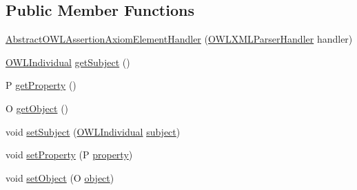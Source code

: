 \subsection*{Public Member Functions}
\begin{DoxyCompactItemize}
\item 
\hyperlink{classorg_1_1coode_1_1owlapi_1_1owlxmlparser_1_1_abstract_o_w_l_assertion_axiom_element_handler_3400ddbb774fad720b1e593f64f8eec5c_a1da5eaf534d45363fe870e9d575d419d}{Abstract\-O\-W\-L\-Assertion\-Axiom\-Element\-Handler} (\hyperlink{classorg_1_1coode_1_1owlapi_1_1owlxmlparser_1_1_o_w_l_x_m_l_parser_handler}{O\-W\-L\-X\-M\-L\-Parser\-Handler} handler)
\item 
\hyperlink{interfaceorg_1_1semanticweb_1_1owlapi_1_1model_1_1_o_w_l_individual}{O\-W\-L\-Individual} \hyperlink{classorg_1_1coode_1_1owlapi_1_1owlxmlparser_1_1_abstract_o_w_l_assertion_axiom_element_handler_3400ddbb774fad720b1e593f64f8eec5c_a8fbeb072a0ed7fd3f73ecd8eb6bcfdf8}{get\-Subject} ()
\item 
P \hyperlink{classorg_1_1coode_1_1owlapi_1_1owlxmlparser_1_1_abstract_o_w_l_assertion_axiom_element_handler_3400ddbb774fad720b1e593f64f8eec5c_a1a99e4db426c1bffc99bcf87b22bcdf6}{get\-Property} ()
\item 
O \hyperlink{classorg_1_1coode_1_1owlapi_1_1owlxmlparser_1_1_abstract_o_w_l_assertion_axiom_element_handler_3400ddbb774fad720b1e593f64f8eec5c_a63b877d7308fadd891f978d8bc8245c7}{get\-Object} ()
\item 
void \hyperlink{classorg_1_1coode_1_1owlapi_1_1owlxmlparser_1_1_abstract_o_w_l_assertion_axiom_element_handler_3400ddbb774fad720b1e593f64f8eec5c_ad111b4853de03d8f7f41da1873ef3d72}{set\-Subject} (\hyperlink{interfaceorg_1_1semanticweb_1_1owlapi_1_1model_1_1_o_w_l_individual}{O\-W\-L\-Individual} \hyperlink{classorg_1_1coode_1_1owlapi_1_1owlxmlparser_1_1_abstract_o_w_l_assertion_axiom_element_handler_3400ddbb774fad720b1e593f64f8eec5c_ae4e2e75193f17306c6ab9e01d654bac4}{subject})
\item 
void \hyperlink{classorg_1_1coode_1_1owlapi_1_1owlxmlparser_1_1_abstract_o_w_l_assertion_axiom_element_handler_3400ddbb774fad720b1e593f64f8eec5c_a560eadcbdb08f317b126419047214e3e}{set\-Property} (P \hyperlink{classorg_1_1coode_1_1owlapi_1_1owlxmlparser_1_1_abstract_o_w_l_assertion_axiom_element_handler_3400ddbb774fad720b1e593f64f8eec5c_adc4b96acf3123175c2feb940e6fef30a}{property})
\item 
void \hyperlink{classorg_1_1coode_1_1owlapi_1_1owlxmlparser_1_1_abstract_o_w_l_assertion_axiom_element_handler_3400ddbb774fad720b1e593f64f8eec5c_acba816f85530af6196cc13e585b44ca5}{set\-Object} (O \hyperlink{classorg_1_1coode_1_1owlapi_1_1owlxmlparser_1_1_abstract_o_w_l_assertion_axiom_element_handler_3400ddbb774fad720b1e593f64f8eec5c_a23d0b77f882861be12ecdc19b60641ca}{object})
\end{DoxyCompactItemize}
